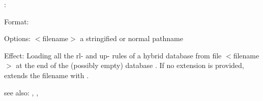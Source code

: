 :

Format: 

Options: $<$filename$>$ a stringified or normal pathname

Effect: Loading all the rl- and up- rules of a hybrid database from file 
	$<$filename$>$ at the end of the (possibly empty) database .
        If no extension is provided, \COLAB{} extends the filename with .

see also: \consult, \destroy, \replace
